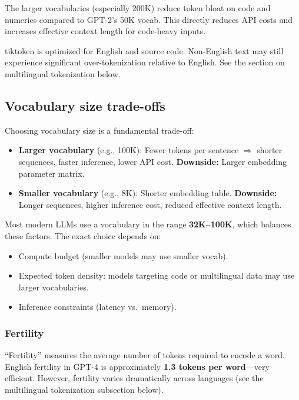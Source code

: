 The larger vocabularies (especially 200K) reduce token bloat on code and numerics compared to GPT-2's 50K vocab. This directly reduces API costs and increases effective context length for code-heavy inputs.

\begin{warnbox}
tiktoken is optimized for English and source code. Non-English text may still experience significant over-tokenization relative to English. See the section on multilingual tokenization below.
\end{warnbox}

\subsection{Vocabulary size trade-offs}

Choosing vocabulary size is a fundamental trade-off:

\begin{notebox}
\begin{itemize}
  \item \textbf{Larger vocabulary} (e.g., 100K): Fewer tokens per sentence $\Rightarrow$ shorter sequences, faster inference, lower API cost. \textbf{Downside:} Larger embedding parameter matrix.
  \item \textbf{Smaller vocabulary} (e.g., 8K): Shorter embedding table. \textbf{Downside:} Longer sequences, higher inference cost, reduced effective context length.
\end{itemize}
\end{notebox}

Most modern LLMs use a vocabulary in the range \textbf{32K–100K}, which balances these factors. The exact choice depends on:
\begin{itemize}
  \item Compute budget (smaller models may use smaller vocab).
  \item Expected token density: models targeting code or multilingual data may use larger vocabularies.
  \item Inference constraints (latency vs.\ memory).
\end{itemize}

\subsubsection*{Fertility}

``Fertility'' measures the average number of tokens required to encode a word. English fertility in GPT-4 is approximately \textbf{1.3 tokens per word}—very efficient. However, fertility varies dramatically across languages (see the multilingual tokenization subsection below).

